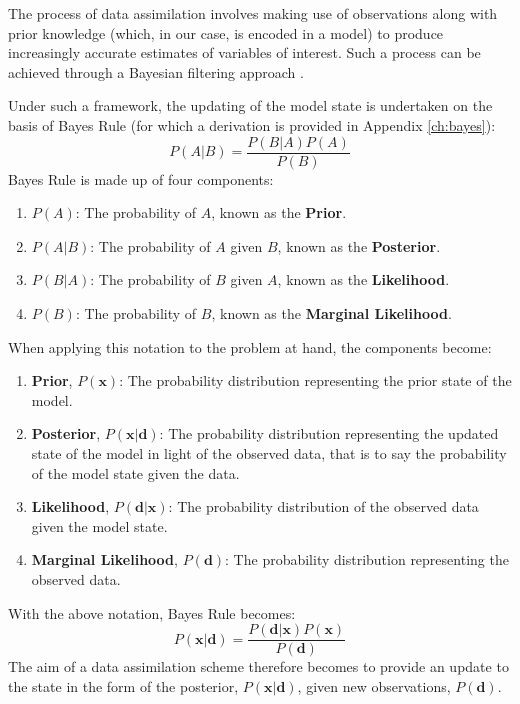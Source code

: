 The process of data assimilation involves making use of observations along with
prior knowledge (which, in our case, is encoded in a model) to produce
increasingly accurate estimates of variables of interest.
Such a process can be achieved through a Bayesian filtering approach
\citep{jazwinski1970mathematics, bar2004estimation}.

Under such a framework, the updating of the model state is undertaken on the
basis of Bayes Rule (for which a derivation is provided in Appendix
\ref{ch:bayes}):
\begin{equation}
    P(A|B) = \frac{P(B|A) P(A)}{P(B)}
\end{equation}
Bayes Rule is made up of four components:
\begin{enumerate}
    \item $P \left( A \right)$: The probability of $A$, known as the
        \textbf{Prior}.
    \item $P \left( A|B \right)$: The probability of $A$ given $B$, known as the
        \textbf{Posterior}.
    \item $P \left( B|A \right)$: The probability of $B$ given $A$, known as the
        \textbf{Likelihood}.
    \item $P \left( B \right)$: The probability of $B$, known as the
        \textbf{Marginal Likelihood}.
\end{enumerate}
When applying this notation to the problem at hand, the components become:
\begin{enumerate}
    \item \textbf{Prior}, $P(\mathbf{x})$: The probability distribution
        representing the prior state of the model.
    \item \textbf{Posterior}, $P(\mathbf{x}|\mathbf{d})$: The probability
        distribution representing the updated state of the model in light of the
        observed data, that is to say the probability of the model state given
        the data.
    \item \textbf{Likelihood}, $P(\mathbf{d}|\mathbf{x})$: The probability
        distribution of the observed data given the model state.
    \item \textbf{Marginal Likelihood}, $P(\mathbf{d})$: The probability
        distribution representing the observed data.
\end{enumerate}
With the above notation, Bayes Rule becomes:
\begin{equation}
    P \left( \mathbf{x} | \mathbf{d} \right) =
       \frac{P \left( \mathbf{d} | \mathbf{x} \right)
             P \left( \mathbf{x} \right)}{P \left( \mathbf{d} \right)} 
\end{equation}
The aim of a data assimilation scheme therefore becomes to provide an update to
the  state in the form of the posterior, $P \left( \mathbf{x} | \mathbf{d}
\right)$, given new observations, $P \left( \mathbf{d} \right)$.

